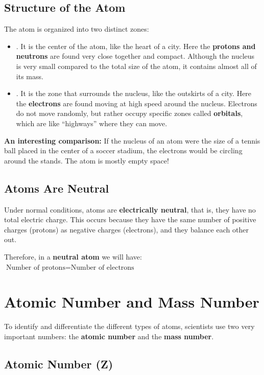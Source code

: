 \subsection{Structure of the Atom}
The atom is organized into two distinct zones:
\begin{itemize}
    \item {}. It is the center of the atom, like the heart of a city. Here the \textbf{protons and neutrons} are found very close together and compact. Although the nucleus is very small compared to the total size of the atom, it contains almost all of its mass.
    \item {}. It is the zone that surrounds the nucleus, like the outskirts of a city. Here the \textbf{electrons} are found moving at high speed around the nucleus. Electrons do not move randomly, but rather occupy specific zones called \textbf{orbitals}, which are like ``highways'' where they can move.
\end{itemize}
\begin{remark}
    \textbf{An interesting comparison:} If the nucleus of an atom were the size of a tennis ball placed in the center of a soccer stadium, the electrons would be circling around the stands. The atom is mostly empty space!
\end{remark}
\subsection{Atoms Are Neutral}
Under normal conditions, atoms are \textbf{electrically neutral}, that is, they have no total electric charge. This occurs because they have the same number of positive charges (protons) as negative charges (electrons), and they balance each other out.

Therefore, in a \textbf{neutral atom} we will have: \(\text{Number of protons} = \text{Number of electrons}\)

\section{Atomic Number and Mass Number}

To identify and differentiate the different types of atoms, scientists use two very important numbers: the \textbf{atomic number} and the \textbf{mass number}.

\subsection{Atomic Number (Z)}

